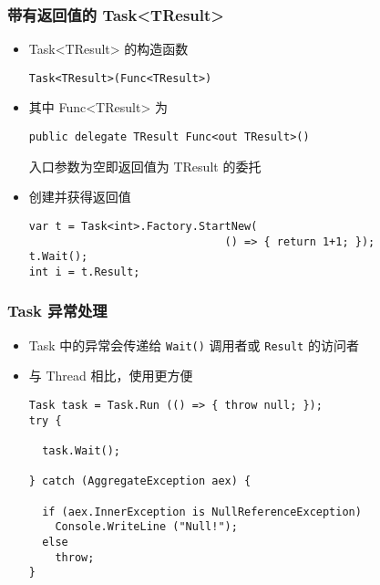 \begin{frame}[fragile]
\frametitle{带有返回值的 Task<TResult>}
\begin{itemize}
\item Task<TResult> 的构造函数
\begin{lstlisting}
Task<TResult>(Func<TResult>)
\end{lstlisting}
\item 其中 Func<TResult> 为
\begin{lstlisting}
public delegate TResult Func<out TResult>()
\end{lstlisting}
入口参数为空即返回值为 TResult 的委托
\item 创建并获得返回值
\begin{lstlisting}
var t = Task<int>.Factory.StartNew(
                              () => { return 1+1; });
t.Wait();
int i = t.Result;
\end{lstlisting}
\end{itemize}

\end{frame}


\begin{frame}[fragile]
\frametitle{Task 异常处理}

\begin{itemize}
\item Task 中的异常会传递给 \texttt{Wait()} 调用者或 \texttt{Result} 的访问者
\item 与 Thread 相比，使用更方便
\begin{lstlisting}
Task task = Task.Run (() => { throw null; });
try {

  task.Wait();

} catch (AggregateException aex) {

  if (aex.InnerException is NullReferenceException)
    Console.WriteLine ("Null!");
  else
    throw;
}
\end{lstlisting}
\end{itemize}

\end{frame}



